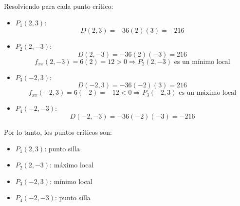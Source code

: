 \documentclass{article}
\begin{document}
Resolviendo para cada punto crítico:
\begin{itemize}
  \item $P_1(2, 3)$:
  \[
    D(2, 3) = -36(2)(3) = -216
  \]
  \item $P_2(2, -3)$:
  \[
    D(2, -3) = -36(2)(-3) = 216
  \]
  \[
    f_{xx}(2, -3) = 6(2) = 12 > 0 \Rightarrow P_2(2, -3) \text{ es un mínimo local}
  \]
  \item $P_3(-2, 3)$:
  \[
    D(-2, 3) = -36(-2)(3) = 216
  \]
  \[
    f_{xx}(-2, 3) = 6(-2) = -12 < 0 \Rightarrow P_3(-2, 3) \text{ es un máximo local}
  \]
  \item $P_4(-2, -3)$:
  \[
    D(-2, -3) = -36(-2)(-3) = -216
  \]
\end{itemize}

Por lo tanto, los puntos críticos son:
\begin{itemize}
  \item $P_1(2, 3)$: punto silla
  \item $P_2(2, -3)$: máximo local
  \item $P_3(-2, 3)$: mínimo local
  \item $P_4(-2, -3)$: punto silla
\end{itemize}
\end{document}
